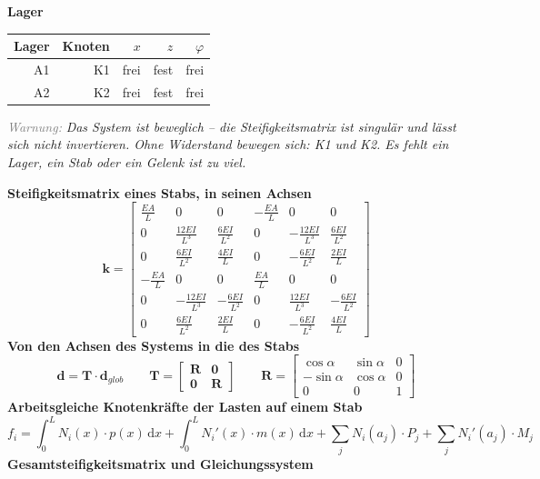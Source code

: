 \documentclass[11pt,a4paper]{article}
\newcommand{\hinweis}[2]{\par\noindent\textcolor{gray}{\textit{#1:}} \textit{#2}\par}
\begin{document}
\noindent\textbf{Lager}
\begin{longtable}{rrrrr}
\hline
Lager & Knoten & $x$ & $z$ & $\varphi$ \\
\hline
\endhead
A1 & K1 & frei & fest & frei \\
A2 & K2 & frei & fest & frei \\
\hline
\end{longtable}
\hinweis{Warnung}{Das System ist beweglich – die Steifigkeitsmatrix ist singulär und lässt sich nicht invertieren. Ohne Widerstand bewegen sich: K1 und K2. Es fehlt ein Lager, ein Stab oder ein Gelenk ist zu viel.}
\noindent\textbf{Steifigkeitsmatrix eines Stabs, in seinen Achsen}
\begin{equation*}
\mathbf{k} = \begin{bmatrix} \frac{EA}{L} & 0 & 0 & -\frac{EA}{L} & 0 & 0 \\ 0 & \frac{12EI}{L^3} & \frac{6EI}{L^2} & 0 & -\frac{12EI}{L^3} & \frac{6EI}{L^2} \\ 0 & \frac{6EI}{L^2} & \frac{4EI}{L} & 0 & -\frac{6EI}{L^2} & \frac{2EI}{L} \\ -\frac{EA}{L} & 0 & 0 & \frac{EA}{L} & 0 & 0 \\ 0 & -\frac{12EI}{L^3} & -\frac{6EI}{L^2} & 0 & \frac{12EI}{L^3} & -\frac{6EI}{L^2} \\ 0 & \frac{6EI}{L^2} & \frac{2EI}{L} & 0 & -\frac{6EI}{L^2} & \frac{4EI}{L} \end{bmatrix}
\end{equation*}
\noindent\textbf{Von den Achsen des Systems in die des Stabs}
\begin{equation*}
\mathbf{d} = \mathbf{T} \cdot \mathbf{d}_{glob} \qquad \mathbf{T} = \begin{bmatrix} \mathbf{R} & \mathbf{0} \\ \mathbf{0} & \mathbf{R} \end{bmatrix} \qquad \mathbf{R} = \begin{bmatrix} \cos\alpha & \sin\alpha & 0 \\ -\sin\alpha & \cos\alpha & 0 \\ 0 & 0 & 1 \end{bmatrix}
\end{equation*}
\noindent\textbf{Arbeitsgleiche Knotenkräfte der Lasten auf einem Stab}
\begin{equation*}
f_i = \int_0^L N_i(x) \cdot p(x)\,\mathrm{d}x + \int_0^L N_i'(x) \cdot m(x)\,\mathrm{d}x + \sum_j N_i(a_j) \cdot P_j + \sum_j N_i'(a_j) \cdot M_j
\end{equation*}
\noindent\textbf{Gesamtsteifigkeitsmatrix und Gleichungssystem}
\end{document}
